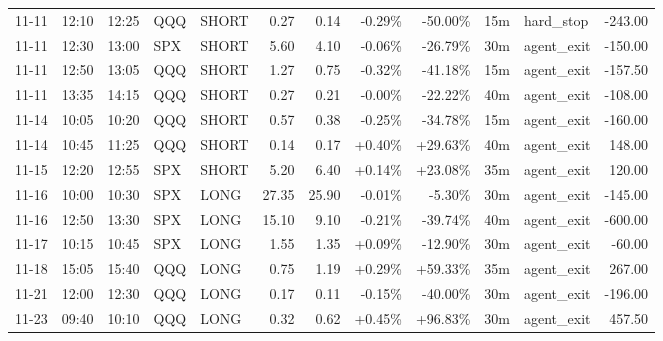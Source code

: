 \documentclass[11pt,a4paper,twoside]{article}
\begin{document}
\begin{center}
\begin{longtable}{>{\color{txtmain}}l l l l l r r r r r >{\color{txtmain}}l r}
11-11 & 12:10 & 12:25 & QQQ & SHORT & 0.27 & 0.14 & \textcolor{lossred}{-0.29\%} & \textcolor{lossred}{-50.00\%} & 15m & hard\_stop & \textcolor{lossred}{-243.00} \\
11-11 & 12:30 & 13:00 & SPX & SHORT & 5.60 & 4.10 & \textcolor{lossred}{-0.06\%} & \textcolor{lossred}{-26.79\%} & 30m & agent\_exit & \textcolor{lossred}{-150.00} \\
11-11 & 12:50 & 13:05 & QQQ & SHORT & 1.27 & 0.75 & \textcolor{lossred}{-0.32\%} & \textcolor{lossred}{-41.18\%} & 15m & agent\_exit & \textcolor{lossred}{-157.50} \\
11-11 & 13:35 & 14:15 & QQQ & SHORT & 0.27 & 0.21 & \textcolor{wingreen}{-0.00\%} & \textcolor{lossred}{-22.22\%} & 40m & agent\_exit & \textcolor{lossred}{-108.00} \\
11-14 & 10:05 & 10:20 & QQQ & SHORT & 0.57 & 0.38 & \textcolor{lossred}{-0.25\%} & \textcolor{lossred}{-34.78\%} & 15m & agent\_exit & \textcolor{lossred}{-160.00} \\
11-14 & 10:45 & 11:25 & QQQ & SHORT & 0.14 & 0.17 & \textcolor{wingreen}{+0.40\%} & \textcolor{wingreen}{+29.63\%} & 40m & agent\_exit & \textcolor{wingreen}{148.00} \\
11-15 & 12:20 & 12:55 & SPX & SHORT & 5.20 & 6.40 & \textcolor{wingreen}{+0.14\%} & \textcolor{wingreen}{+23.08\%} & 35m & agent\_exit & \textcolor{wingreen}{120.00} \\
11-16 & 10:00 & 10:30 & SPX & LONG & 27.35 & 25.90 & \textcolor{lossred}{-0.01\%} & \textcolor{lossred}{-5.30\%} & 30m & agent\_exit & \textcolor{lossred}{-145.00} \\
11-16 & 12:50 & 13:30 & SPX & LONG & 15.10 & 9.10 & \textcolor{lossred}{-0.21\%} & \textcolor{lossred}{-39.74\%} & 40m & agent\_exit & \textcolor{lossred}{-600.00} \\
11-17 & 10:15 & 10:45 & SPX & LONG & 1.55 & 1.35 & \textcolor{wingreen}{+0.09\%} & \textcolor{lossred}{-12.90\%} & 30m & agent\_exit & \textcolor{lossred}{-60.00} \\
11-18 & 15:05 & 15:40 & QQQ & LONG & 0.75 & 1.19 & \textcolor{wingreen}{+0.29\%} & \textcolor{wingreen}{+59.33\%} & 35m & agent\_exit & \textcolor{wingreen}{267.00} \\
11-21 & 12:00 & 12:30 & QQQ & LONG & 0.17 & 0.11 & \textcolor{lossred}{-0.15\%} & \textcolor{lossred}{-40.00\%} & 30m & agent\_exit & \textcolor{lossred}{-196.00} \\
11-23 & 09:40 & 10:10 & QQQ & LONG & 0.32 & 0.62 & \textcolor{wingreen}{+0.45\%} & \textcolor{wingreen}{+96.83\%} & 30m & agent\_exit & \textcolor{wingreen}{457.50} \\

\end{longtable}
\end{center}
\end{document}
